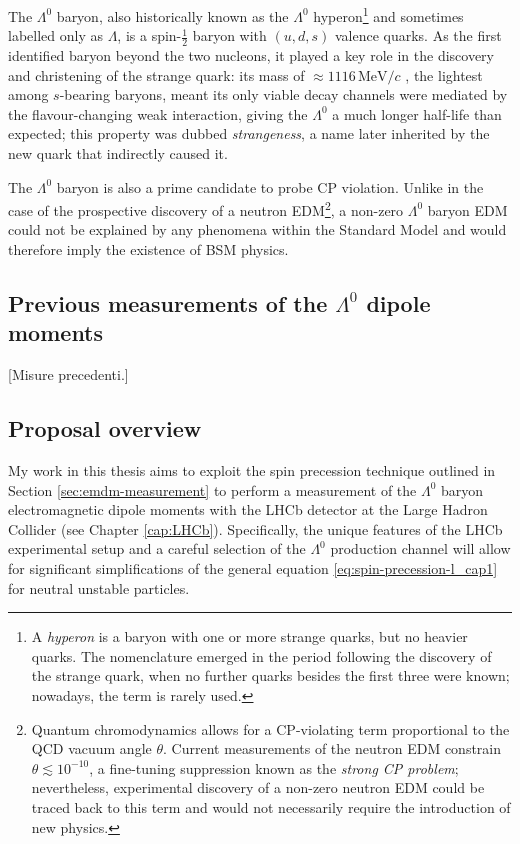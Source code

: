 The $\Lambda^0$ baryon, also historically known as the $\Lambda^0$ hyperon\footnote{A \textit{hyperon} is a baryon with one or more strange quarks, but no heavier quarks. The nomenclature emerged in the period following the discovery of the strange quark, when no further quarks besides the first three were known; nowadays, the term is rarely used.} and sometimes labelled only as $\Lambda$, is a spin-$\frac{1}{2}$ baryon with $(u,d,s)$ valence quarks.
As the first identified baryon beyond the two nucleons, it played a key role in the discovery and christening of the strange quark:
its mass of $\approx 1116\,\text{MeV}/c$ \cite{PDG}, the lightest among $s$-bearing baryons, meant its only viable decay channels were mediated by the flavour-changing weak interaction, giving the $\Lambda^0$ a much longer half-life than expected;
this property was dubbed \textit{strangeness}, a name later inherited by the new quark that indirectly caused it.

The $\Lambda^0$ baryon is also a prime candidate to probe CP violation.
Unlike in the case of the prospective discovery of a neutron
EDM\footnote{Quantum chromodynamics allows for a CP-violating term proportional to the QCD vacuum angle $\theta$. Current measurements of the neutron EDM \cite{neutronTheta} constrain $\theta \lesssim {10}^{-10}$,
a fine-tuning suppression known as the \textit{strong CP problem}; nevertheless, experimental discovery of a non-zero neutron EDM could be traced back to this term and would not necessarily require the introduction of new physics.},
a non-zero $\Lambda^0$ baryon EDM could not be explained by any phenomena within the Standard Model and would therefore imply the existence of BSM physics.

\subsection{Previous measurements of the \texorpdfstring{$\Lambda^0$}{Lambda} dipole moments}

[Misure precedenti.]

\subsection{Proposal overview}
My work in this thesis aims to exploit the spin precession technique outlined in Section \ref{sec:emdm-measurement} to perform a measurement of the $\Lambda^0$ baryon electromagnetic dipole moments with the LHCb detector at the Large Hadron Collider (see Chapter \ref{cap:LHCb}).
Specifically, the unique features of the LHCb experimental setup and a careful selection of the $\Lambda^0$ production channel will allow for significant simplifications of the general equation \eqref{eq:spin-precession-l_cap1} for neutral unstable particles.

